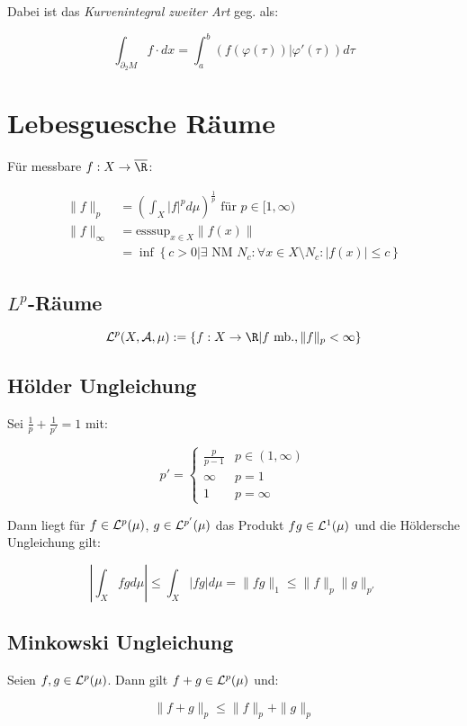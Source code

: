 Dabei ist das \emph{Kurvenintegral zweiter Art} geg. als:

$$\int_{\partial_2 M} f \cdot dx = \int_a^b (f(\varphi(\tau))|\varphi'(\tau)) d\tau$$

\section*{Lebesguesche Räume}

Für messbare $f : X \to \overline\R$:

\vspace{-4mm}
\begin{align*}
\|f\|_p &= \left(\int_X |f|^p d\mu\right)^\frac{1}{p} \text{ für } p \in [1,\infty)\\
\|f\|_\infty &= \text{esssup}_{x \in X} \|f(x)\|\\
      &= \inf\left\{ c > 0 | \exists \text{ NM } N_c : \forall x \in X \setminus N_c : |f(x)| \leq c\right\}
\end{align*}

\subsection*{$L^p$-Räume}

$$\L^p(X,\A,\mu) := \{ f : X \to \R | f \text{ mb.}, \|f\|_p < \infty\}$$

\subsection*{Hölder Ungleichung}

Sei $\frac{1}{p} + \frac{1}{p'} = 1$ mit:

\vspace{-4mm}
$$p' = \begin{cases}
	\frac{p}{p-1} & p \in (1, \infty) \\
	\infty        & p = 1 \\
	1        & p = \infty
\end{cases}$$

Dann liegt für $f \in \mathcal{L}^p(\mu)$, $g \in \mathcal{L}^{p'}(\mu)$ das Produkt $fg \in \mathcal{L}^1(\mu)$ und die Höldersche Ungleichung gilt:

\vspace{-4mm}
$$\left| \int_X fg d\mu \right| \leq \int_X |fg| d\mu = \|fg\|_1 \leq \|f\|_p \|g\|_{p'}$$

\subsection*{Minkowski Ungleichung}

Seien $f, g \in \mathcal{L}^p(\mu)$. Dann gilt $f + g \in \mathcal{L}^p(\mu)$ und:

\vspace{-2mm}
$$\| f + g \|_p \leq \|f\|_p + \|g\|_p$$
